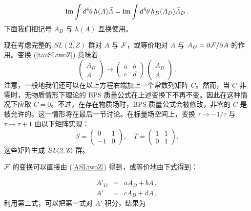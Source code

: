 $$
{\rm Im}\int d^4\theta\,h(A)\bar A=
{\rm Im}\int d^4\theta\,h_D(A_D)\bar A_D\,. 
$$
下面我们把记号 $A_D$ 与 $h(A)$ 互换使用。

现在考虑完整的 $SL(2,Z)$ 群对 $A$ 与 ${\cal F}$，或等价地对 $A$ 与 $A_D=\partial{\cal F}/\partial A$ 的作用。变换 (\ref{tauSLtwoZ}) 意味着
\begin{equation}
\left(\begin{array}{c}A_D\\ A\end{array}\right)\rightarrow
\left(\begin{array}{cc} a & b \\ c & d \end{array}\right)
\,\left(\begin{array}{c}A_D\\ A \end{array}\right) \,.
\label{ASLtwoZ}
\end{equation} 
注意，一般地我们还可以在以上方程右端加上一个常数列矩阵 $C$。然而，当 $C$ 非零时，无物质情形下理论的 BPS 质量公式在上述变换下不再不变。因此在这种情况下应取 $C=0$。不过，在存在物质场时，BPS 质量公式会被修改，非零的 $C$ 是被允许的。这一情形将在最后一节讨论。在标量场空间上，变换 $\tau\rightarrow -1/\tau$ 与 $\tau\rightarrow \tau+1$ 由以下矩阵实现：
\begin{equation}  
S=\left(\begin{array}{cc}0&1\\-1&0\end{array}\right),\quad
T=\left(\begin{array}{cc}1&1\\0&1\end{array}\right).
\label{ST}
\end{equation}
这些矩阵生成 $SL(2,{\rm Z})$ 群。

${\cal F}$ 的变换可以直接由 (\ref{ASLtwoZ}) 得到，或等价地由下式得到：

\begin{eqnarray}
A'_D &=& a A_D + b A\,, \nonumber\\
A'   &=& c A_D + d A\,. \nonumber
\end{eqnarray}
利用第二式，可以把第一式对 $A'$ 积分，结果为

